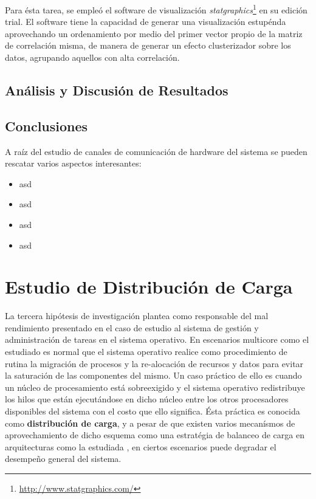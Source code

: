 Para ésta tarea, se empleó el software de visualización \emph{statgraphics}\footnote{\url{http://www.statgraphics.com/}} en su edición trial. El software tiene la capacidad de generar una visualización estupénda aprovechando un ordenamiento por medio del primer vector propio de la matriz de correlación misma, de manera de generar un efecto clusterizador sobre los datos, agrupando aquellos con alta correlación.

\subsection{Análisis y Discusión de Resultados}

\subsection{Conclusiones}
A raíz del estudio de canales de comunicación de hardware del sistema se pueden rescatar varios aspectos interesantes:
\begin{itemize}
\item asd
\item asd
\item asd
\item asd
\end{itemize}

\section{Estudio de Distribución de Carga}
La tercera hipótesis de investigación plantea como responsable del mal rendimiento presentado en el caso de estudio al sistema de gestión y administración de tareas en el sistema operativo. En escenarios multicore como el estudiado es normal que el sistema operativo realice como procedimiento de rutina la migración de procesos y la re-alocación de recursos y datos para evitar la saturación de las componentes del mismo. Un caso práctico de ello es cuando un núcleo de procesamiento está sobreexigido y el sistema operativo redistribuye los hilos que están ejecutándose en dicho núcleo entre los otros procesadores disponibles del sistema con el costo que ello significa. Ésta práctica es conocida como \textbf{distribución de carga}, y a pesar de que existen varios mecanísmos de aprovechamiento de dicho esquema como una estratégia de balanceo de carga en arquitecturas como la estudiada \cite{paper:NUMA}, en ciertos escenarios puede degradar el desempeño general del sistema.

